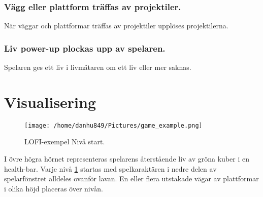 \documentclass{TDP005mall}
\begin{document}
\subsubsection{Vägg eller plattform träffas av projektiler.}
När väggar och plattformar träffas av projektiler upplöses projektilerna.

\subsubsection{Liv power-up plockas upp av spelaren.}
Spelaren ges ett liv i livmätaren om ett liv eller mer saknas. 

\newpage
\section{Visualisering}%

\begin{figure}[h!]
  \caption{LOFI-exempel Nivå start.\label{fig:4}}
  \centerline{\texttt{[image: /home/danhu849/Pictures/game\_example.png]}}  
\end{figure}

I övre högra hörnet representeras spelarens återstående liv av gröna kuber i en health-bar. Varje nivå \ref{fig:4} startas med spelkaraktären i nedre delen av spelarfönstret alldeles ovanför lavan. En eller flera utstakade vägar av plattformar i olika höjd placeras över nivån.
\end{document}
